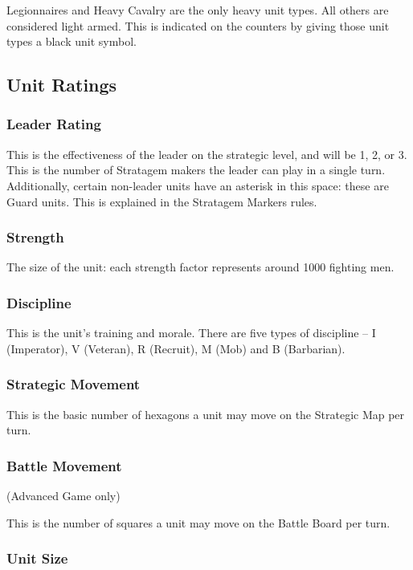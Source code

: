 Legionnaires and Heavy Cavalry are the only heavy unit types. All others are considered light armed. This is indicated on the counters by giving those unit types a black unit symbol.

\subsection{Unit Ratings}

\subsubsection{Leader Rating}

This is the effectiveness of the leader on the strategic level, and will be 1, 2, or 3. This is the number of Stratagem makers the leader can play in a single turn. Additionally, certain non-leader units have an asterisk in this space: these are Guard units. This is explained in the Stratagem Markers rules.

\subsubsection{Strength}

The size of the unit: each strength factor represents around 1000 fighting men.

\subsubsection{Discipline}

This is the unit's training and morale. There are five types of discipline – I (Imperator), V (Veteran), R (Recruit), M (Mob) and B (Barbarian).

\subsubsection{Strategic Movement}

This is the basic number of hexagons a unit may move on the Strategic Map per turn.

\subsubsection{Battle Movement} (Advanced Game only)

This is the number of squares a unit may move on the Battle Board per turn.

\subsubsection{Unit Size}

